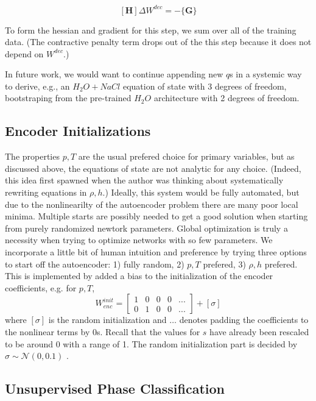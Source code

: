 \documentclass[]{article}
\begin{document}
\[[\mathbf{H}] \Delta W^{dec} = -\{\mathbf{G}\}\]

To form the hessian and gradient for this step, we sum over all of the
training data. (The contractive penalty term drops out of the this step because it does
not depend on \(W^{dec}\).)

In future work, we would want to continue appending new \(q\)s in a
systemic way to derive, e.g., an \(H_2O + NaCl\) equation of state with
3 degrees of freedom, bootstraping from the pre-trained \(H_2O\)
architecture with 2 degrees of freedom.

\hypertarget{header-n3312}{%
\subsection{Encoder Initializations}\label{header-n3312}}

The properties \(p,T\) are the usual prefered choice for primary
variables, but as discussed above, the equations of state are not
analytic for any choice. (Indeed, this idea first spawned when the
author was thinking about systematically rewriting equations in
\(\rho,h\).) Ideally, this system would be fully automated, but due to
the nonlinearilty of the autoencoder problem there are many poor local minima.
Multiple starts are possibly needed
to get a good solution when starting from purely randomized newtork
parameters. Global optimization is truly a necessity when trying to
optimize networks with so few parameters. We incorporate a little bit of
human intuition and preference by trying three options to start off the
autoencoder: 1) fully random, 2) \(p,T\) prefered, 3) \(\rho,h\)
prefered. This is implemented by added a bias to the initialization of
the encoder coefficients, e.g. for \(p,T\),
\begin{equation}
 W^{init}_{enc} = \left[\begin{array}{ccccc}
1 & 0 & 0 & 0 & ... \\
0 & 1 & 0 & 0 & ...
                        \end{array}\right]+[\sigma]
\end{equation}
where \([\sigma]\) is the random initialization and \(…\) denotes
padding the coefficients to the nonlinear terms by 0s. Recall that the
values for \(s\) have already been rescaled to be around 0 with a range
of 1. The random initialization part is decided by
\(\sigma \sim \mathcal{N}(0,0.1)\) .

\hypertarget{header-n3317}{%
\subsection{Unsupervised Phase Classification}\label{header-n3317}}
\end{document}
